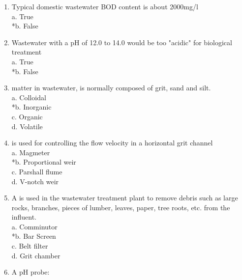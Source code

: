 \begin{enumerate}
\vspace{0.4cm}
\item  Typical domestic wastewater BOD content is about 2000mg/l \\

a. True \\
*b. False 

\vspace{0.4cm}
\item  Wastewater with a pH of 12.0 to 14.0 would be too "acidic" for biological treatment \\

a. True \\
*b. False


\vspace{0.4cm}
\item {\underline{\hspace{1cm}}} matter in wastewater, is normally composed of grit, sand and silt.\\

a. Colloidal \\
*b. Inorganic \\
c. Organic \\
d. Volatile 

\vspace{0.4cm}
\item {\underline{\hspace{1cm}}} is used for controlling the flow velocity in a horizontal grit channel\\

a. Magmeter\\
*b. Proportional weir \\
c. Parshall flume \\
d. V-notch weir 


\vspace{0.4cm}
\item A {\underline{\hspace{1cm}}} is used in the wastewater treatment plant to remove debris such as large rocks, branches, pieces of lumber, leaves, paper, tree roots, etc. from the influent. \\

a. Comminutor \\
*b. Bar Screen \\
c. Belt filter \\
d. Grit chamber 

\vspace{0.4cm}
\item A pH probe: \\


\end{enumerate}
